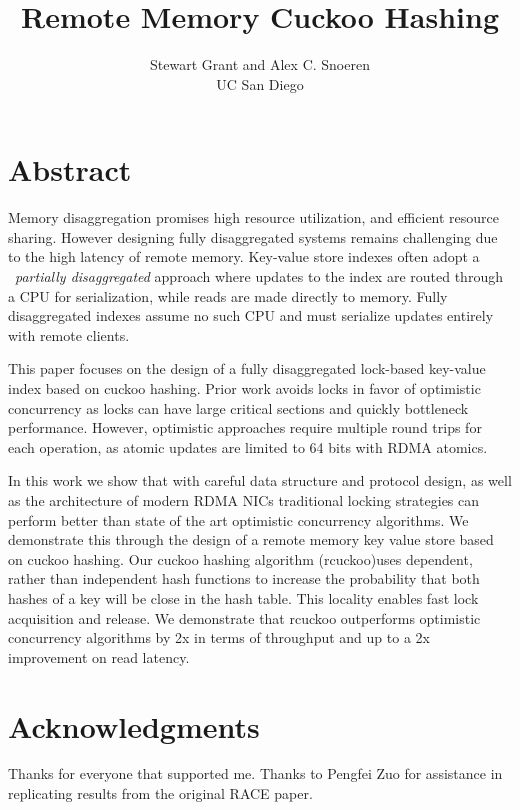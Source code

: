 \documentclass[10pt,twocolumn]{article}
\begin{document}
\title{Remote Memory Cuckoo Hashing}
\author{Stewart Grant and Alex C. Snoeren\\ UC San Diego}
\date{}

\maketitle

\section*{Abstract}

Memory disaggregation promises high resource utilization,
and efficient resource sharing. However designing fully
disaggregated systems remains challenging due to the high
latency of remote memory. Key-value store indexes often
adopt a ~\textit{partially disaggregated} approach where
updates to the index are routed through a CPU for
serialization, while reads
 are made directly to memory.
Fully disaggregated indexes assume no such CPU and must
serialize updates entirely with remote clients.

This paper focuses on the design of a
 fully
 disaggregated
lock-based key-value index based on cuckoo
 hashing. Prior
work avoids locks in favor of optimistic concurrency as
locks can have large critical sections and quickly
bottleneck performance. However, optimistic approaches
require multiple round trips for each operation, as atomic
updates are limited to 64 bits with RDMA atomics. 

In this work we show that
with careful data structure and protocol design, as well as
the architecture of modern RDMA NICs traditional locking
strategies can perform better than state of the art
optimistic concurrency algorithms. We demonstrate this
through the design of a remote memory key value store based
on cuckoo hashing. Our cuckoo hashing algorithm (rcuckoo)uses dependent,
rather than independent hash functions to increase the
probability that both hashes of a key will be
close in the hash table. This locality enables fast lock
acquisition and release. We demonstrate that rcuckoo
outperforms optimistic concurrency algorithms by 2x in
terms of throughput and up to a 2x improvement on read
latency.











\section*{Acknowledgments}

Thanks for everyone that supported me. Thanks to Pengfei Zuo
for assistance in replicating results from the original RACE
paper.


\balance
\vspace{-0.3cm}
{\footnotesize 
}
\vspace{-0.5cm}
\end{document}

